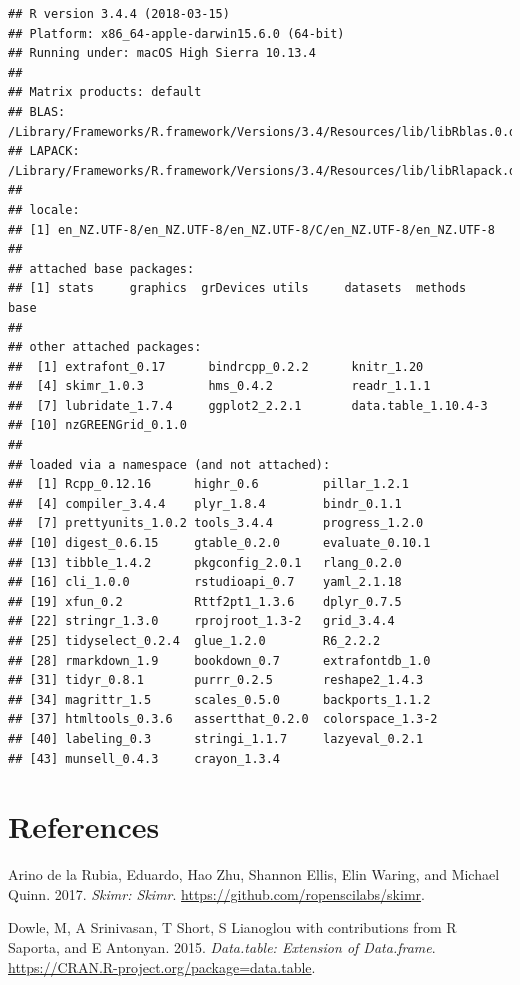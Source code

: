 \documentclass[]{article}
\theoremstyle{definition}
\theoremstyle{definition}
\theoremstyle{definition}
\theoremstyle{remark}
\begin{document}
\begin{verbatim}
## R version 3.4.4 (2018-03-15)
## Platform: x86_64-apple-darwin15.6.0 (64-bit)
## Running under: macOS High Sierra 10.13.4
## 
## Matrix products: default
## BLAS: /Library/Frameworks/R.framework/Versions/3.4/Resources/lib/libRblas.0.dylib
## LAPACK: /Library/Frameworks/R.framework/Versions/3.4/Resources/lib/libRlapack.dylib
## 
## locale:
## [1] en_NZ.UTF-8/en_NZ.UTF-8/en_NZ.UTF-8/C/en_NZ.UTF-8/en_NZ.UTF-8
## 
## attached base packages:
## [1] stats     graphics  grDevices utils     datasets  methods   base     
## 
## other attached packages:
##  [1] extrafont_0.17      bindrcpp_0.2.2      knitr_1.20         
##  [4] skimr_1.0.3         hms_0.4.2           readr_1.1.1        
##  [7] lubridate_1.7.4     ggplot2_2.2.1       data.table_1.10.4-3
## [10] nzGREENGrid_0.1.0  
## 
## loaded via a namespace (and not attached):
##  [1] Rcpp_0.12.16      highr_0.6         pillar_1.2.1     
##  [4] compiler_3.4.4    plyr_1.8.4        bindr_0.1.1      
##  [7] prettyunits_1.0.2 tools_3.4.4       progress_1.2.0   
## [10] digest_0.6.15     gtable_0.2.0      evaluate_0.10.1  
## [13] tibble_1.4.2      pkgconfig_2.0.1   rlang_0.2.0      
## [16] cli_1.0.0         rstudioapi_0.7    yaml_2.1.18      
## [19] xfun_0.2          Rttf2pt1_1.3.6    dplyr_0.7.5      
## [22] stringr_1.3.0     rprojroot_1.3-2   grid_3.4.4       
## [25] tidyselect_0.2.4  glue_1.2.0        R6_2.2.2         
## [28] rmarkdown_1.9     bookdown_0.7      extrafontdb_1.0  
## [31] tidyr_0.8.1       purrr_0.2.5       reshape2_1.4.3   
## [34] magrittr_1.5      scales_0.5.0      backports_1.1.2  
## [37] htmltools_0.3.6   assertthat_0.2.0  colorspace_1.3-2 
## [40] labeling_0.3      stringi_1.1.7     lazyeval_0.2.1   
## [43] munsell_0.4.3     crayon_1.3.4
\end{verbatim}

\section*{References}\label{references}

\hypertarget{refs}{}
\hypertarget{ref-skimr}{}
Arino de la Rubia, Eduardo, Hao Zhu, Shannon Ellis, Elin Waring, and
Michael Quinn. 2017. \emph{Skimr: Skimr}.
\url{https://github.com/ropenscilabs/skimr}.

\hypertarget{ref-data.table}{}
Dowle, M, A Srinivasan, T Short, S Lianoglou with contributions from R
Saporta, and E Antonyan. 2015. \emph{Data.table: Extension of
Data.frame}. \url{https://CRAN.R-project.org/package=data.table}.
\end{document}
